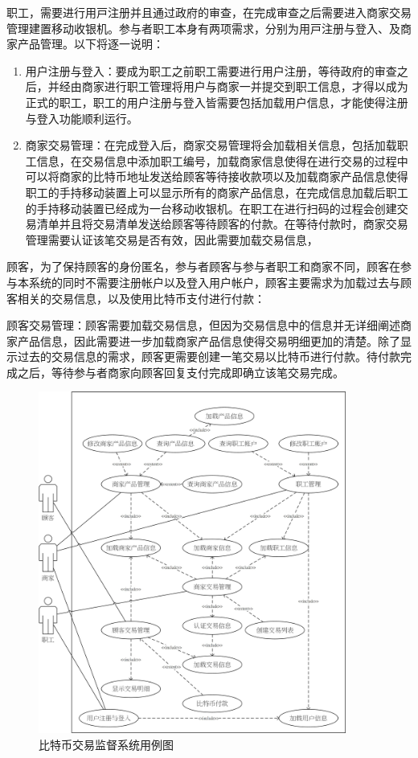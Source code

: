 职⼯，需要进⾏⽤⼾注册并且通过政府的审查，在完成审查之后需要进⼊商家交易管理建置移动收银机。参与者职⼯本⾝有两项需求，分别为⽤⼾注册与登⼊、及商家产品管理。以下将逐⼀说明：


	\begin{enumerate}
	\item 用户注册与登入：要成为职工之前职工需要进行用户注册，等待政府的审查之后，并经由商家进行职工管理将用户与商家一并提交到职工信息，才得以成为正式的职工，职工的用户注册与登入皆需要包括加载用户信息，才能使得注册与登入功能顺利运行。
	\item 商家交易管理：在完成登入后，商家交易管理将会加载相关信息，包括加载职工信息，在交易信息中添加职工编号，加载商家信息使得在进行交易的过程中可以将商家的比特币地址发送给顾客等待接收款项以及加载商家产品信息使得职工的手持移动装置上可以显示所有的商家产品信息，在完成信息加载后职工的手持移动装置已经成为一台移动收银机。在职工在进行扫码的过程会创建交易清单并且将交易清单发送给顾客等待顾客的付款。在等待付款时，商家交易管理需要认证该笔交易是否有效，因此需要加载交易信息，
	\end{enumerate}

顾客，为了保持顾客的身份匿名，参与者顾客与参与者职工和商家不同，顾客在参与本系统的同时不需要注册帐户以及登入用户帐户，顾客主要需求为加载过去与顾客相关的交易信息，以及使用比特币支付进行付款：


顾客交易管理：顾客需要加载交易信息，但因为交易信息中的信息并无详细阐述商家产品信息，因此需要进一步加载商家产品信息使得交易明细更加的清楚。除了显示过去的交易信息的需求，顾客更需要创建一笔交易以⽐特币进⾏付款。待付款完成之后，等待参与者商家向顾客回复⽀付完成即确立该笔交易完成。

	\begin{figure}[!htbp]
	\centering
	\includegraphics[width = 0.9\textwidth]{UC.jpg}
	\caption{比特币交易监督系统⽤例图}\label{UC}
	\end{figure}

